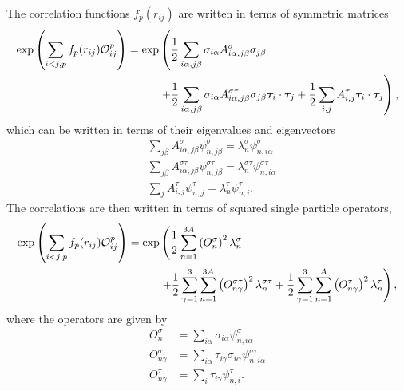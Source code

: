 The correlation functions $f_p(r_{ij})$ are written in terms of symmetric matrices
\begin{equation}
\begin{split}
   \exp\left(\sum\limits_{i<j,p}f_p(r_{ij})\mathcal{O}^p_{ij}\right) = \exp&\left(\frac{1}{2}\sum\limits_{i\alpha,j\beta} \sigma_{i\alpha}A^{\sigma}_{i\alpha,j\beta}\sigma_{j\beta}\right. \\
      &\left. + \frac{1}{2}\sum\limits_{i\alpha,j\beta} \sigma_{i\alpha}A^{\sigma\tau}_{i\alpha,j\beta}\sigma_{j\beta}\bm{\tau}_i\cdot\bm{\tau}_j
      + \frac{1}{2}\sum\limits_{i,j} A^{\tau}_{i,j}\bm{\tau}_i\cdot\bm{\tau}_j\right),
   \label{equ:amatrices}
\end{split}
\end{equation}
which can be written in terms of their eigenvalues and eigenvectors
\begin{align}
   &\sum\limits_{j\beta} A^{\sigma}_{i\alpha,j\beta}\psi^{\sigma}_{n,j\beta} = \lambda^{\sigma}_n\psi^{\sigma}_{n,i\alpha} \\
   &\sum\limits_{j\beta} A^{\sigma\tau}_{i\alpha,j\beta}\psi^{\sigma\tau}_{n,j\beta} = \lambda^{\sigma\tau}_n\psi^{\sigma\tau}_{n,i\alpha} \\
   &\sum\limits_{j} A^{\tau}_{i,j}\psi^{\tau}_{n,j} = \lambda^{\tau}_n\psi^{\tau}_{n,i}.
\end{align}
The correlations are then written in terms of squared single particle operators,
\begin{equation}
\begin{split}
   \exp\left(\sum\limits_{i<j,p}f_p(r_{ij})\mathcal{O}^p_{ij}\right) = \exp&\left(\frac{1}{2}\sum\limits_{n=1}^{3A} \left(O_{n}^{\sigma}\right)^2 \lambda_n^{\sigma}\right. \\
      & \left. + \frac{1}{2}\sum\limits_{\gamma=1}^{3}\sum\limits_{n=1}^{3A} \left(O_{n\gamma}^{\sigma\tau}\right)^2 \lambda_n^{\sigma\tau}
      + \frac{1}{2}\sum\limits_{\gamma=1}^{3}\sum\limits_{n=1}^{A} \left(O_{n\gamma}^{\tau}\right)^2 \lambda_n^{\tau}\right),
\end{split}
\end{equation}
where the operators are given by
\begin{equation}
\begin{split}
   O_{n}^{\sigma} &= \sum\limits_{i\alpha} \sigma_{i\alpha}\psi_{n,i\alpha}^{\sigma} \\
   O_{n\gamma}^{\sigma\tau} &= \sum\limits_{i\alpha} \tau_{i\gamma}\sigma_{i\alpha}\psi_{n,i\alpha}^{\sigma\tau} \\
   O_{n\gamma}^{\tau} &= \sum\limits_{i} \tau_{i\gamma}\psi_{n,i}^{\tau}.
   \label{equ:OA}
\end{split}
\end{equation}

